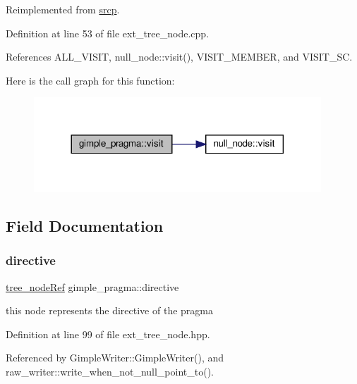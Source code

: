 Reimplemented from \hyperlink{structsrcp_a1cd5943380f069e6ed0a33566af2566d}{srcp}.



Definition at line 53 of file ext\+\_\+tree\+\_\+node.\+cpp.



References A\+L\+L\+\_\+\+V\+I\+S\+IT, null\+\_\+node\+::visit(), V\+I\+S\+I\+T\+\_\+\+M\+E\+M\+B\+ER, and V\+I\+S\+I\+T\+\_\+\+SC.

Here is the call graph for this function\+:
\nopagebreak
\begin{figure}[H]
\begin{center}
\leavevmode
\includegraphics[width=305pt]{de/df6/structgimple__pragma_ac7dac0c665ea703c9d8f0891016ef972_cgraph}
\end{center}
\end{figure}


\subsection{Field Documentation}
\mbox{\label{structgimple__pragma_aa642b5dac7ec2b18b1be78830e6aedf1}} 
\subsubsection{\texorpdfstring{directive}{directive}}
{\footnotesize\ttfamily \hyperlink{tree__node_8hpp_a6ee377554d1c4871ad66a337eaa67fd5}{tree\+\_\+node\+Ref} gimple\+\_\+pragma\+::directive}



this node represents the directive of the pragma 



Definition at line 99 of file ext\+\_\+tree\+\_\+node.\+hpp.



Referenced by Gimple\+Writer\+::\+Gimple\+Writer(), and raw\+\_\+writer\+::write\+\_\+when\+\_\+not\+\_\+null\+\_\+point\+\_\+to().

